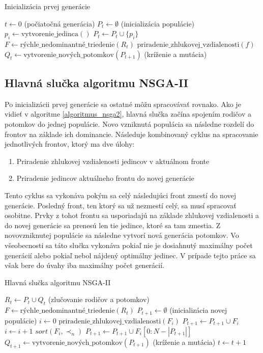 \vspace*{\dimexpr 0.5\baselineskip\relax}
\begin{algorithm}[h]
\caption{Inicializácia prvej generácie}
\label{algoritmus_initialization_generation}
  $t \gets 0$ (počiatočná generácia)\;
  $P_t \gets \emptyset$ (inicializácia populácie)\;
   {
    $p_i \gets \text{vytvorenie\_jedinca}()$\;
    $P_t \gets P_t \cup \{p_i\}$\;
  }
  $F \gets \text{rýchle\_nedominantné\_triedenie}(R_t)$\;
   {
    $\text{priradenie\_zhlukovej\_vzdialenosti}(f)$\;
  }
  $Q_t \gets \text{vytvorenie\_nových\_potomkov}(P_{t+1})$ (kríženie a mutácia)\;
\end{algorithm}

\subsection*{Hlavná slučka algoritmu NSGA-II}
Po inicializácii prvej generácie sa ostatné môžu spracovávať rovnako.
Ako je vidieť v algoritme \ref{algoritmus_nsga2}, hlavná slučka začína spojením rodičov a potomkov do jednej populácie.
Novo vzniknutá populácia sa následne rozdelí do frontov na základe ich dominancie.
Následuje kombinovaný cyklus na spracovanie jednotlivých frontov, ktorý ma dve úlohy:
\begin{enumerate}
  \item Priradenie zhlukovej vzdialenosti jedincov v aktuálnom fronte
  \item Priradenie jedincov aktuálneho frontu do novej generácie
\end{enumerate}
Tento cyklus sa vykonáva pokým sa celý následujúci front zmestí do novej generácie.
Posledný front, ten ktorý sa už nezmestí celý, sa musí spracovať osobitne.
Prvky z tohot frontu sa usporiadajú na základe zhlukovej vzdialenosti a do novej generácie sa prenesú len tie jedince, ktoré sa tam zmestia.
Z novovzniknutej populácie sa následne vytvorí nová generácia potomkov.
Vo všeobecnosti sa táto slučka vykonáva pokiaľ nie je dosiahnutý maximálny počet generácií alebo pokiaľ nebol nájdený optimálny jedinec.
V prípade tejto práce sa však bere do úvahy iba maximálny počet generácií.

\vspace*{\dimexpr 0.5\baselineskip\relax}
\begin{algorithm}[h]
\caption{Hlavná slučka algoritmu NSGA-II}
\label{algoritmus_nsga2}
  $R_t \gets P_t \cup Q_t$ (zlučovanie rodičov a potomkov)\;
  $F \gets \text{rýchle\_nedominantné\_triedenie}(R_t)$\;
  $P_{t+1} \gets \emptyset$ (inicializácia novej populácie)\;
  $i \gets 0$\;
   {
    $\text{priradenie\_zhlukovej\_vzdialenosti}(F_i)$\;
    $P_{t+1} \gets P_{t+1} \cup F_i$\;
    $i \gets i + 1$\;
  }
  $sort(F_i, \prec_n)$\;
  $P_{t+1} \gets P_{t+1} \cup F_i[0:N - |P_{t+1}|]$\;
  $Q_{t+1} \gets \text{vytvorenie\_nových\_potomkov}(P_{t+1})$ (kríženie a mutácia)\;
  $t \gets t + 1$\;
\end{algorithm}

